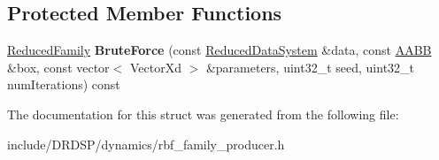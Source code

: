 \subsection*{Protected Member Functions}
\begin{DoxyCompactItemize}
\item 
\hypertarget{struct_d_r_d_s_p_1_1_r_b_f_family_producer_a1163c5bef56c9fa9e578fa13aaaad329}{\hyperlink{struct_d_r_d_s_p_1_1_p_map_family}{Reduced\-Family} {\bfseries Brute\-Force} (const \hyperlink{struct_d_r_d_s_p_1_1_reduced_data_system}{Reduced\-Data\-System} \&data, const \hyperlink{struct_d_r_d_s_p_1_1_a_a_b_b}{A\-A\-B\-B} \&box, const vector$<$ Vector\-Xd $>$ \&parameters, uint32\-\_\-t seed, uint32\-\_\-t num\-Iterations) const }\label{struct_d_r_d_s_p_1_1_r_b_f_family_producer_a1163c5bef56c9fa9e578fa13aaaad329}

\end{DoxyCompactItemize}


The documentation for this struct was generated from the following file\-:\begin{DoxyCompactItemize}
\item 
include/\-D\-R\-D\-S\-P/dynamics/rbf\-\_\-family\-\_\-producer.\-h\end{DoxyCompactItemize}
